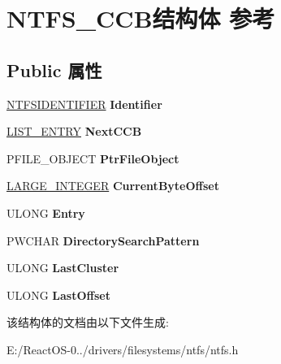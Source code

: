 \hypertarget{struct_n_t_f_s___c_c_b}{}\section{N\+T\+F\+S\+\_\+\+C\+C\+B结构体 参考}
\label{struct_n_t_f_s___c_c_b}
\subsection*{Public 属性}
\begin{DoxyCompactItemize}
\item 
\mbox{\label{struct_n_t_f_s___c_c_b_a57e6702e6ca996f51232e36a3d5627f3}} 
\hyperlink{struct_n_t_f_s_i_d_e_n_t_i_f_i_e_r}{N\+T\+F\+S\+I\+D\+E\+N\+T\+I\+F\+I\+ER} {\bfseries Identifier}
\item 
\mbox{\label{struct_n_t_f_s___c_c_b_a550d2ce5cdc4a6822365758490c51590}} 
\hyperlink{struct___l_i_s_t___e_n_t_r_y}{L\+I\+S\+T\+\_\+\+E\+N\+T\+RY} {\bfseries Next\+C\+CB}
\item 
\mbox{\label{struct_n_t_f_s___c_c_b_a1963d8362938725678bfccbde94717c1}} 
P\+F\+I\+L\+E\+\_\+\+O\+B\+J\+E\+CT {\bfseries Ptr\+File\+Object}
\item 
\mbox{\label{struct_n_t_f_s___c_c_b_aeed6c51e1c4f51d7322db68215d72795}} 
\hyperlink{union___l_a_r_g_e___i_n_t_e_g_e_r}{L\+A\+R\+G\+E\+\_\+\+I\+N\+T\+E\+G\+ER} {\bfseries Current\+Byte\+Offset}
\item 
\mbox{\label{struct_n_t_f_s___c_c_b_a967b935e529d11304768866f08700a6b}} 
U\+L\+O\+NG {\bfseries Entry}
\item 
\mbox{\label{struct_n_t_f_s___c_c_b_a913c7e0b10d80def703aa3c6909f609e}} 
P\+W\+C\+H\+AR {\bfseries Directory\+Search\+Pattern}
\item 
\mbox{\label{struct_n_t_f_s___c_c_b_a628f488d09702312219906ae09115535}} 
U\+L\+O\+NG {\bfseries Last\+Cluster}
\item 
\mbox{\label{struct_n_t_f_s___c_c_b_af2acd5130c0d0078a80ca422bfe2d04c}} 
U\+L\+O\+NG {\bfseries Last\+Offset}
\end{DoxyCompactItemize}


该结构体的文档由以下文件生成\+:\begin{DoxyCompactItemize}
\item 
E\+:/\+React\+O\+S-\/0../drivers/filesystems/ntfs/ntfs.\+h\end{DoxyCompactItemize}
